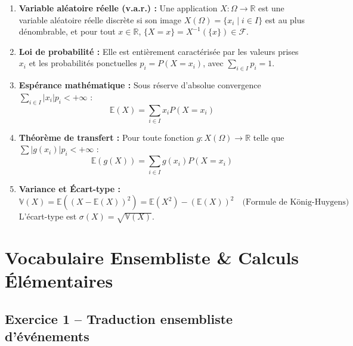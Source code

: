 \documentclass[11pt,a4paper]{article}
\newcommand{\R}{\mathbb{R}}
\newcommand{\E}{\mathbb{E}}
\newcommand{\V}{\mathbb{V}}
\begin{document}
\begin{coursbox}
\begin{enumerate}
    \item \textbf{Variable aléatoire réelle (v.a.r.) :} Une application $X : \Omega \to \R$ est une variable aléatoire réelle discrète si son image $X(\Omega) = \{x_i \mid i \in I\}$ est au plus dénombrable, et pour tout $x \in \R$, $\{X = x\} = X^{-1}(\{x\}) \in \mathscr{F}$.
    \item \textbf{Loi de probabilité :} Elle est entièrement caractérisée par les valeurs prises $x_i$ et les probabilités ponctuelles $p_i = P(X = x_i)$, avec $\sum_{i \in I} p_i = 1$.
    \item \textbf{Espérance mathématique :} Sous réserve d'absolue convergence $\sum_{i \in I} |x_i| p_i < +\infty$ :
    \[
    \E(X) = \sum_{i \in I} x_i P(X = x_i)
    \]
    \item \textbf{Théorème de transfert :} Pour toute fonction $g : X(\Omega) \to \R$ telle que $\sum |g(x_i)| p_i < +\infty$ :
    \[
    \E(g(X)) = \sum_{i \in I} g(x_i) P(X = x_i)
    \]
    \item \textbf{Variance et Écart-type :}
    \[
    \V(X) = \E\left((X - \E(X))^2\right) = \E(X^2) - (\E(X))^2 \quad \text{(Formule de König-Huygens)}
    \]
    L'écart-type est $\sigma(X) = \sqrt{\V(X)}$.
\end{enumerate}
\end{coursbox}

\vspace{0.4cm}

\section{Vocabulaire Ensembliste \& Calculs Élémentaires}

\subsection*{Exercice 1 -- Traduction ensembliste d'événements}
\end{document}
